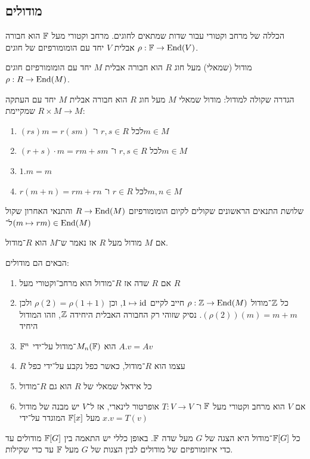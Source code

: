 \subsection{מודולים}
הכללה של מרחב וקטורי עבור שדות שמתאים לחוגים.
מרחב וקטורי מעל $\mathbb{F}$ הוא חבורה אבלית $V$ יחד עם הומומורפיזם של חוגים $\rho : \mathbb{F} \to \operatorname{End}(V)$.
\begin{definition}[מודול]
	מודול (שמאלי) מעל חוג $R$ הוא חבורה אבלית $M$ יחד עם הומומורפיזם חוגים $\rho : R \to \operatorname{End}(M)$.
\end{definition}
\begin{proposition}
	הגדרה שקולה למודול:
	מודול שמאלי $M$ מעל חוג $R$ הוא חבורה אבלית $M$ יחד עם העתקה $R \times M \to M$ שמקיימת:
	\begin{enumerate}
		\item $(r s) m = r (s m)$ לכל $r, s \in R$ ו־$m \in M$
		\item $(r + s) \cdot m = r m + s m$ לכל $r, s \in R$ ו־$m \in M$
		\item $1 . m = m$
		\item $r (m + n) = r m + r n$ לכל $r \in R$ ו־$m, n \in M$
	\end{enumerate}
	שלושת התנאים הראשונים שקולים לקיום הומומורפיזם $R \to \operatorname{End}(M)$ והתנאי האחרון שקול ל־$(m \mapsto r m) \in \operatorname{End}(M)$
\end{proposition}
\begin{notation}
	אם $M$ מודול מעל $R$ אז נאמר ש־$M$ הוא $R$־מודול.
\end{notation}
\begin{example}
	הבאים הם מודולים:
	\begin{enumerate}
		\item אם $R$ שדה אז $R$־מודול הוא מרחב־וקטורי מעל $R$
		\item כל $\mathbb{Z}$־מודול $\rho : \mathbb{Z} \to \operatorname{End}(M)$ חייב לקיים $1 \mapsto \operatorname{id}$, וכן $\rho(2) = \rho(1 + 1)$ ולכן $(\rho(2))(m) = m + m$.
			נסיק שזוהי רק החבורה האבלית היחידה $\mathbb{Z}$, וזהו המודול היחיד
		\item $\mathbb{F}^n$ הוא $M_n(\mathbb{F})$־מודול על־ידי $A . v = A v$
		\item $R$ עצמו הוא $R$־מודול, כאשר כפל נקבע על־ידי כפל
		\item כל אידאל שמאלי של $R$ הוא גם $R$־מודול
		\item אם $V$ הוא מרחב וקטורי מעל $\mathbb{F}$ ו־ $T : V \to V$ אופרטור לינארי, אז ל־$V$ יש מבנה של מודול מעל $\mathbb{F}[x]$ המוגדר על־ידי $x . v = T(v)$
	\end{enumerate}
\end{example}
\begin{proposition}
		כל $\mathbb{F}[G]$־מודול היא הצגה של $G$ מעל שדה $\mathbb{F}$.
		באופן כללי יש התאמה בין $\mathbb{F}[G]$ מודולים עד כדי איזומורפיזם של מודולים לבין הצגות של $G$ מעל $\mathbb{F}$ עד כדי שקילות.
\end{proposition}

